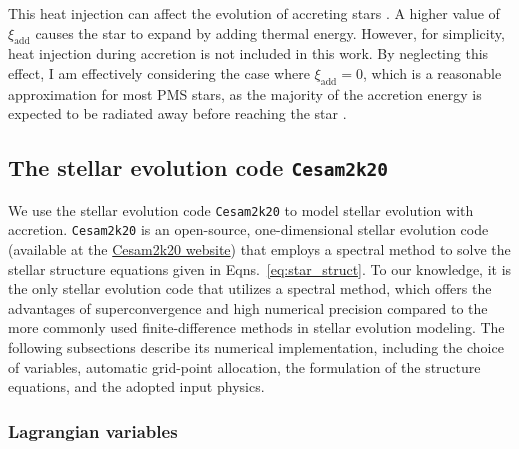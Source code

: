 \documentclass[12pt,a4paper]{article}
\newcommand{\mr}{\mathrm}
\begin{document}
This heat injection can affect the evolution of accreting stars \parencite[e.g., ][]{KunitomoEtAl2017,AmardMatt2023}. A higher value of $\xi_\mathrm{add}$ causes the star to expand by adding thermal energy. However, for simplicity, heat injection during accretion is not included in this work. By neglecting this effect, I am effectively considering the case where $\xi_\mr{add} = 0$, which is a reasonable approximation for most PMS stars, as the majority of the accretion energy is expected to be radiated away before reaching the star \parencite{HartmannEtAl1998}.




\subsection{The stellar evolution code \texttt{Cesam2k20}}
\label{sec:cesam2k20}

We use the stellar evolution code \texttt{Cesam2k20} \parencite{MarquesEtAl2013,MorelLebreton2008,Morel1997} to model stellar evolution with accretion. \texttt{Cesam2k20} is an open-source, one-dimensional stellar evolution code (available at the \href{https://www.ias.u-psud.fr/cesam2k20/home.html}{Cesam2k20 website}) that employs a spectral method to solve the stellar structure equations given in Eqns.~\eqref{eq:star_struct}. To our knowledge, it is the only stellar evolution code that utilizes a spectral method, which offers the advantages of superconvergence and high numerical precision compared to the more commonly used finite-difference methods in stellar evolution modeling. The following subsections describe its numerical implementation, including the choice of variables, automatic grid-point allocation, the formulation of the structure equations, and the adopted input physics.

\subsubsection{Lagrangian variables}
\label{sec:cesam2k20_variables}
\end{document}
